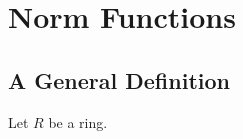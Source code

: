 \section{Norm Functions}\label{Ch2:Sec:Norms}

\subsection{A General Definition}

Let $R$ be a ring.

\begin{boxdefinition}[Norm]
    
\end{boxdefinition}

